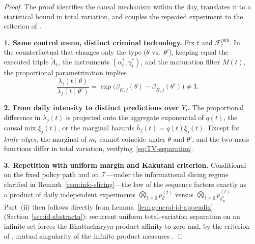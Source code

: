 \documentclass[ecta,nameyear,final,supplement]{econsocart}
\numberwithin{equation}{section}
\numberwithin{table}{section}
\theoremstyle{definition}
\begin{document}
\begin{proof}
The proof identifies the causal mechanism within the day, translates it to a
statistical bound in total variation, and couples the repeated experiment to
the criterion of \citet{Kakutani1948}.

\smallskip
\noindent\textbf{1. Same control menu, distinct criminal technology.}
Fix $t$ and $\mathcal{F}_t^{\mathrm{pub}}$. In the counterfactual that changes
only the type ($\theta$ vs.\ $\theta'$), keeping equal the executed triple
$\tilde{A}_t$, the instruments $(\alpha_t^\ast,\gamma_t^\ast)$, and the
maturation filter $M(t)$, the proportional parametrization implies
\[
\frac{\lambda_j(t\mid\theta)}{\lambda_j(t\mid\theta')}
=\exp\!\bigl(\beta_{K,j}(\theta)-\beta_{K,j}(\theta')\bigr)\neq 1.
\]

\smallskip
\noindent\textbf{2. From daily intensity to distinct predictions over $Y_t$.}
The proportional difference in $\lambda_j(t)$ is projected onto the aggregate
exponential of $q(t)$, the causal mix $\xi_j(t)$, or the marginal hazards
$\bar h_j(t)=q(t)\xi_j(t)$. Except for \emph{knife-edges}, the marginal of $m_t$
cannot coincide under $\theta$ and $\theta'$, and the two mass functions differ
in total variation, verifying~\eqref{eq:TV-separation}.

\smallskip
\noindent\textbf{3. Repetition with uniform margin and Kakutani criterion.}
Conditional on the fixed policy path and on $\mathcal{T}$---under the
informational slicing regime clarified in Remark~\ref{rem:info-slicing}---the
law of the sequence factors exactly as a product of daily independent experiments
$\bigotimes_{t\ge 0}p_\theta^{(t)}$ versus
$\bigotimes_{t\ge 0}p_{\theta_K^\ast}^{(t)}$
\citep{Kakutani1948}. Part~(ii) then follows directly from
Lemma~\ref{lem:general-id-appendix} (Section~\ref{sec:id-abstracta}): recurrent
uniform total-variation separation on an infinite set forces the Bhattacharyya
product affinity to zero and, by the criterion of \citet{Kakutani1948}, mutual
singularity of the infinite product measures
\citep{Shiryaev2019Probability}.
\end{proof}

\bigskip
\end{document}
